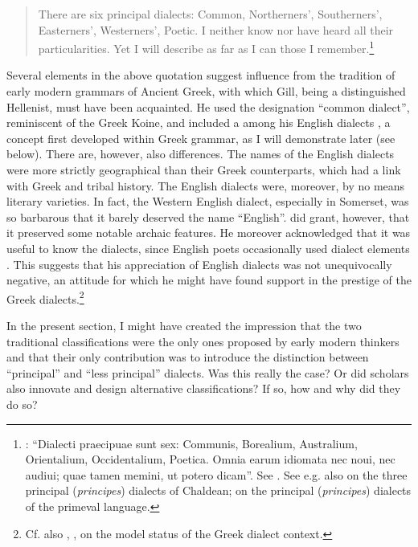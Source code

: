 \begin{quote}
There are six principal dialects: Common, Northerners’, Southerners’, Easterners’, Westerners’, Poetic. I neither know nor have heard all their particularities. Yet I will describe as far as I can those I remember.\footnote{\citet[15]{Gill1619}: “Dialecti praecipuae sunt sex: Communis, Borealium, Australium, Orientalium, Occidentalium, Poetica. Omnia earum idiomata nec noui, nec audiui; quae tamen memini, ut potero dicam”. See \citet{Kokeritz1938}. See e.g. also \citet[liv]{Thomassin1697} on the three principal (\textit{principes}) dialects of Chaldean; \citet[\textsc{xciii}]{Schultens1748} on the principal (\textit{principes}) dialects of the primeval language.}
\end{quote}

Several elements in the above quotation suggest influence from the tradition of early modern grammars of Ancient Greek, with which Gill, being a distinguished Hellenist, must have been acquainted. He used the designation “common dialect”, reminiscent of the Greek Koine, and included a  among his English dialects \citep[18]{Gill1619}, a concept first developed within Greek grammar, as I will demonstrate later (see  below). There are, however, also differences. The names of the English dialects were more strictly geographical than their Greek counterparts, which had a link with Greek  and tribal history. The English dialects were, moreover, by no means literary varieties. In fact, the Western English dialect, especially in Somerset, was so barbarous that it barely deserved the name “English”. \citet[17]{Gill1619} did grant, however, that it preserved some notable archaic features. He moreover acknowledged that it was useful to know the dialects, since English poets occasionally used dialect elements \citep[18]{Gill1619}. This suggests that his appreciation of English dialects was not unequivocally negative, an attitude for which he might have found support in the prestige of the Greek dialects.\footnote{Cf. also , , on the model status of the Greek dialect context.}

In the present section, I might have created the impression that the two traditional classifications were the only ones proposed by early modern thinkers and that their only contribution was to introduce the distinction between “principal” and “less principal” dialects. Was this really the case? Or did scholars also innovate and design alternative classifications? If so, how and why did they do so?

